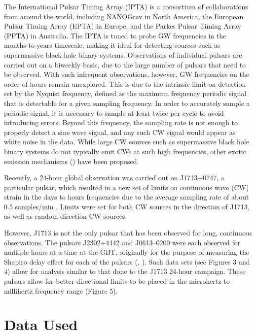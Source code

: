 \documentclass[12pt]{article}
\begin{document}
The International Pulsar Timing Array (IPTA) is a consortium of collaborations
from around the world, including NANOGrav in North America, the European Pulsar
Timing Array (EPTA) in Europe, and the Parkes Pulsar Timing Array (PPTA) in
Australia. The IPTA is tuned to probe GW frequencies in the months-to-years
timescale, making it ideal for detecting sources such as supermassive black hole
binary systems. Observations of individual pulsars are carried out on a biweekly
basis, due to the large number of pulsars that need to be observed. With such
infrequent observations, however, GW frequencies on the order of hours remain
unexplored. This is due to the intrinsic limit on detection set by the Nyquist
frequency, defined as the maximum frequency periodic signal that is detectable
for a given sampling frequency. In order to accurately sample a periodic signal,
it is necessary to sample at least twice per cycle to avoid introducing errors.
Beyond this frequency, the sampling rate is not enough to properly detect a sine
wave signal, and any such CW signal would appear as white noise in the data.
While large CW sources such as supermassive black hole binary systems do not
typically emit CWs at such high frequencies, other exotic emission mechanisms
(\cite{Chernoff}) have been proposed.

Recently, a 24-hour global observation was carried out on J1713+0747, a particular pulsar, which
resulted in a new set of limits on continuous wave (CW) strain in the days to
hours frequencies due to the average sampling rate of about 0.5 samples/min
\cite{Dolch2016}.
Limits were set for both CW sources in the direction of J1713, as well as
random-direction CW sources.

  However, J1713 is not the only pulsar that has been observed for long,
continuous observations. The pulsars J2302+4442 and J0613--0200 were each observed for
multiple hours at a time at the GBT, originally for the purpose of measuring the Shapiro
delay effect for each of the pulsars (\cite{Pennucci2015}, \cite{Fonseca2016}). 
Such data sets (see Figures 3 and 4) allow for analysis similar
to that done to the J1713 24-hour campaign. These pulsars allow for better
directional limits to be placed in the microhertz to millihertz frequency range (Figure 5).

\section{Data Used}
 
\end{document}
